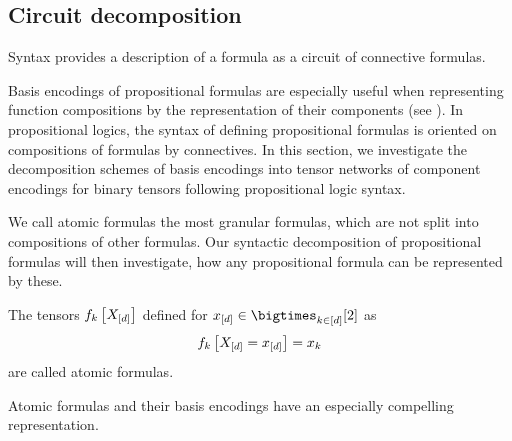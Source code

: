 \subsection{Circuit decomposition}

Syntax provides a description of a formula as a circuit of connective formulas.

Basis encodings of propositional formulas are especially useful when representing function compositions by the representation of their components (see ).
In propositional logics, the syntax of defining propositional formulas is oriented on compositions of formulas by connectives. %
In this section, we investigate the decomposition schemes of basis encodings into tensor networks of component encodings for binary tensors following propositional logic syntax.


We call atomic formulas the most granular formulas, which are not split into compositions of other formulas.
Our syntactic decomposition of propositional formulas will then investigate, how any propositional formula can be represented by these.

\begin{definition}
    The tensors $f_{k}\left[X_{[d]}\right]$ defined for $\shortcatindices\in\atomstates$ as
    \begin{align*}
        f_{k}\left[X_{[d]}=x_{[d]}\right]
        = x_{k}
    \end{align*}
    are called atomic formulas.
\end{definition}

Atomic formulas and their basis encodings have an especially compelling representation.

